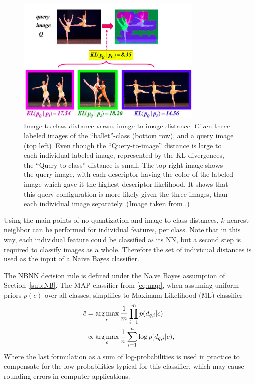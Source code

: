 \begin{figure}[hbt]
    \centering
    \includegraphics[width=0.8\textwidth]{Im2imVsIm2cl}
    \caption{Image-to-class distance versus image-to-image distance. Given three labeled images of the ``ballet''-class (bottom row), and a query image (top left). Even though the ``Query-to-image'' distance is large to each individual labeled image, represented by the KL-divergences, the ``Query-to-class'' distance is small. The top right image shows the query image, with each descriptor having the color of the labeled image which gave it the highest descriptor likelihood. It shows that this query configuration is more likely given the three images, than each individual image separately. (Image taken from \cite{boiman2008defense, irani2006similarity}.)}
    \label{fig:im2im_vs_im2cl}
\end{figure}

Using the main points of no quantization and image-to-class distances, $k$-nearest neighbor can be performed for individual features, per class. Note that in this way, each individual feature could be classified as its NN, but a second step is required to classify images as a whole. Therefore the set of individual distances is used as the input of a Naive Bayes classifier.

The NBNN decision rule is defined under the Naive Bayes assumption of Section~\ref{sub:NB}. The MAP classifier from \eqref{eq:map}, when assuming uniform priors $p(c)$ over all classes, simplifies to Maximum Likelihood (ML) classifier 
\begin{align}
    \hat c &= \operatorname*{arg\,max}_c \frac{1}{m}\prod_{i=1}^{m} p(d_{q,i}|c)\\
           &\propto \operatorname*{arg\,max}_c \frac{1}{n}\sum_{i=1}^{n} \log p(d_{q,i}|c),
\end{align}
Where the last formulation as a sum of log-probabilities is used in practice to compensate for the low probabilities typical for this classifier, which may cause rounding errors in computer applications.


